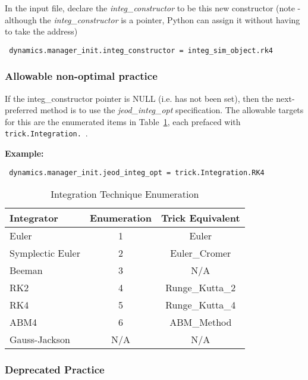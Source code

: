 \begin{enumerate}
In the input file, declare the \textit{integ\_constructor} to be this new 
constructor 
(note - although the \textit{integ\_constructor} is a pointer, Python can 
assign it without having to take the address)
 
\begin{verbatim}
 dynamics.manager_init.integ_constructor = integ_sim_object.rk4
\end{verbatim}

\end{enumerate}


\subsubsection{Allowable non-optimal practice}

If the integ\_constructor pointer is NULL (i.e. has not been set), then the 
next-preferred method is to use the \textit{jeod\_integ\_opt} specification. 
The allowable targets for this are the enumerated items in 
Table~\ref{tab:user_simdev_jeod_integ}, each prefaced with 
\verb+trick.Integration.+~.

\textbf{Example:}
\begin{verbatim}
 dynamics.manager_init.jeod_integ_opt = trick.Integration.RK4
\end{verbatim}

\begin{table}[h!]
\centering
\caption{Integration Technique Enumeration}
\label{tab:user_simdev_jeod_integ}
\vspace{1ex}
\begin{tabular}{||l|c|c|}
\hline
\bf{Integrator} & {\bf Enumeration} & {\bf Trick Equivalent}
\\ \hline \hline
Euler & 1 & Euler \\
Symplectic Euler &2&Euler\_Cromer\\
Beeman &3&N/A\\
RK2 &4&Runge\_Kutta\_2\\
RK4 &5&Runge\_Kutta\_4\\
ABM4 &6&ABM\_Method\\
Gauss-Jackson &N/A&N/A \\
\hline
\end{tabular}
\end{table}

\subsubsection{Deprecated Practice}

